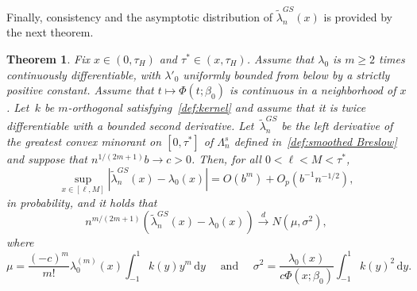 \documentclass[11pt,reqno]{amsart}
\theoremstyle{definition}
\theoremstyle{plain}
\newtheorem{theo}[de]{Theorem}
\theoremstyle{remark}
\begin{document}
Finally, consistency and the asymptotic distribution of $\tilde{\lambda}_n^{GS}(x)$ is provided by the next theorem.
\begin{theo}
\label{theo:as.distrGS}
Fix $x\in(0,\tau_H)$ and $\tau^*\in(x,\tau_H)$.
Assume that $\lambda_0$ is $m\geq2$ times continuously differentiable, with $\lambda'_0$ uniformly bounded from below by a strictly positive constant.
Assume that $t\mapsto \Phi(t;\beta_0)$ is continuous in a neighborhood of $x$.
Let~$k$ be $m$-orthogonal satisfying~\eqref{def:kernel} and assume that it is twice differentiable with a bounded second derivative.
Let~$\tilde{\lambda}_n^{GS}$ be the left derivative of the greatest convex minorant on $[0,\tau^*]$ 
of $\Lambda_n^s$ defined in~\eqref{def:smoothed Breslow}
and suppose that $n^{1/(2m+1)}b\to c>0$.
Then, for all $0<\ell<M<\tau^*$,
\[
\sup_{x\in[\ell,M]}
\left|
\tilde{\lambda}_n^{GS}(x)-\lambda_0(x)
\right|
=
O(b^m)+O_p(b^{-1}n^{-1/2}),
\]
in probability, and it holds that
\[
n^{m/(2m+1)}
\left(
\tilde{\lambda}_n^{GS}(x)-\lambda_0(x)
\right)
\xrightarrow{d}N(\mu,\sigma^2),
\]
where
\[
\mu
=
\frac{(-c)^m}{m!}
\lambda_0^{(m)}(x)
\int_{-1}^1 k(y)y^m\,\mathrm{d}y
\quad\text{ and }\quad
\sigma^2
=
\frac{\lambda_0(x)}{c\Phi(x;\beta_0)}
\int_{-1}^1 k(y)^2\,\mathrm{d}y.
\]
\end{theo}
\end{document}
